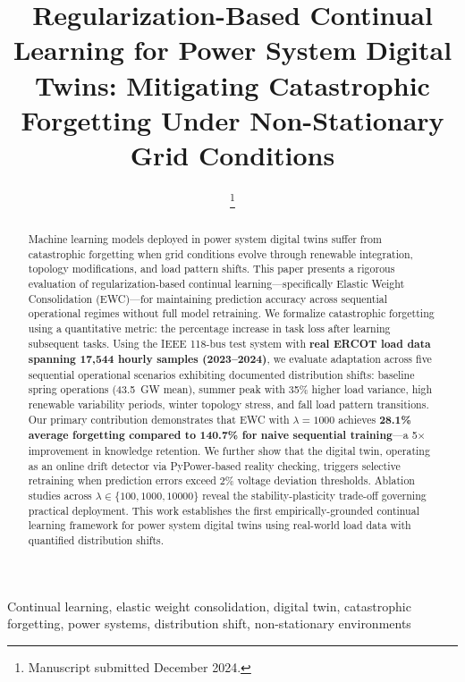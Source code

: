 \documentclass[journal,12pt,onecolumn]{IEEEtran}
\begin{document}
\title{Regularization-Based Continual Learning for Power System Digital Twins: Mitigating Catastrophic Forgetting Under Non-Stationary Grid Conditions}

\author{
\thanks{Manuscript submitted December 2024.}
}

\maketitle

\begin{abstract}
Machine learning models deployed in power system digital twins suffer from catastrophic forgetting when grid conditions evolve through renewable integration, topology modifications, and load pattern shifts. This paper presents a rigorous evaluation of regularization-based continual learning---specifically Elastic Weight Consolidation (EWC)---for maintaining prediction accuracy across sequential operational regimes without full model retraining. We formalize catastrophic forgetting using a quantitative metric: the percentage increase in task loss after learning subsequent tasks. Using the IEEE 118-bus test system with \textbf{real ERCOT load data spanning 17,544 hourly samples (2023--2024)}, we evaluate adaptation across five sequential operational scenarios exhibiting documented distribution shifts: baseline spring operations (43.5~GW mean), summer peak with 35\% higher load variance, high renewable variability periods, winter topology stress, and fall load pattern transitions. Our primary contribution demonstrates that EWC with $\lambda=1000$ achieves \textbf{28.1\% average forgetting compared to 140.7\% for naive sequential training}---a 5$\times$ improvement in knowledge retention. We further show that the digital twin, operating as an online drift detector via PyPower-based reality checking, triggers selective retraining when prediction errors exceed 2\% voltage deviation thresholds. Ablation studies across $\lambda \in \{100, 1000, 10000\}$ reveal the stability-plasticity trade-off governing practical deployment. This work establishes the first empirically-grounded continual learning framework for power system digital twins using real-world load data with quantified distribution shifts.
\end{abstract}

\begin{IEEEkeywords}
Continual learning, elastic weight consolidation, digital twin, catastrophic forgetting, power systems, distribution shift, non-stationary environments
\end{IEEEkeywords}
\end{document}
